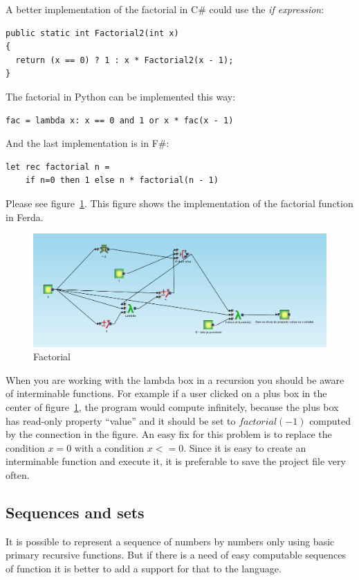 \documentclass[a4paper,12pt]{book}
\begin{document}
A better implementation of the factorial in C\# could use the \emph{if expression}:
\begin{verbatim}
public static int Factorial2(int x)
{
  return (x == 0) ? 1 : x * Factorial2(x - 1);
}
\end{verbatim}

The factorial in Python can be implemented this way:
\begin{verbatim}
fac = lambda x: x == 0 and 1 or x * fac(x - 1)
\end{verbatim}

And the last implementation is in F\#:
\begin{verbatim}
let rec factorial n =
    if n=0 then 1 else n * factorial(n - 1)
\end{verbatim}

Please see figure~\ref{fig:factorial}. This figure shows the implementation of the factorial function in Ferda.
\begin{figure}
	\includegraphics[width=1\textwidth]{faktorial}
	\caption{Factorial}
	\label{fig:factorial}
\end{figure}

When you are working with the lambda box in a recursion you should be aware of interminable functions. For example if a user clicked on a plus box in the center of figure~\ref{fig:factorial}, the program would compute infinitely, because the plus box has read-only property ``value'' and it should be set to $factorial(-1)$ computed by the connection in the figure. An easy fix for this problem is to replace the condition $x=0$ with a condition $x<=0$. Since it is easy to create an interminable function and execute it, it is preferable to save the project file very often.

\subsection{Sequences and sets}
\label{sec:sequences}
It is possible to represent a sequence of numbers by numbers only using basic primary recursive functions. But if there is a need of easy computable sequences of function it is better to add a support for that to the language.
\end{document}
